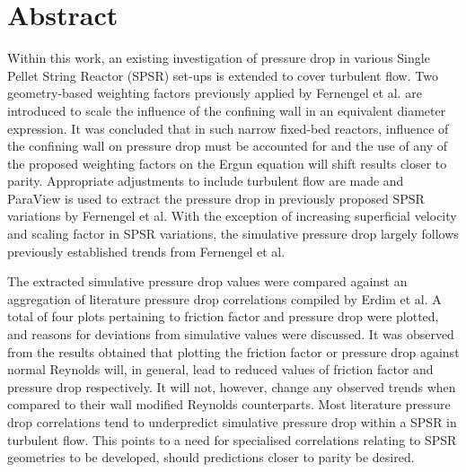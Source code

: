 %
\chapter*{Abstract}
\label{abstract}
%
%
Within this work, an existing investigation of pressure drop in various Single Pellet String Reactor (SPSR) set-ups is extended to cover turbulent flow. Two geometry-based weighting factors previously applied by Fernengel et al. are introduced to scale the influence of the confining wall in an equivalent diameter expression. It was concluded that in such narrow fixed-bed reactors, influence of the confining wall on pressure drop must be accounted for and the use of any of the proposed weighting factors on the Ergun equation will shift results closer to parity. Appropriate adjustments to include turbulent flow are made and ParaView is used to extract the pressure drop in previously proposed SPSR variations by Fernengel et al. With the exception of increasing superficial velocity and scaling factor in SPSR variations, the simulative pressure drop largely follows previously established trends from Fernengel et al.

The extracted simulative pressure drop values were compared against an aggregation of literature pressure drop correlations compiled by Erdim et al. A total of four plots pertaining to friction factor and pressure drop were plotted, and reasons for deviations from simulative values were discussed.
It was observed from the results obtained that plotting the friction factor or pressure drop against normal Reynolds will, in general, lead to reduced values of friction factor and pressure drop respectively. It will not, however, change any observed trends when compared to their wall modified Reynolds counterparts.
Most literature pressure drop correlations tend to underpredict simulative pressure drop within a SPSR in turbulent flow. This points to a need for specialised correlations relating to SPSR geometries to be developed, should predictions closer to parity be desired.

\cleardoublepage